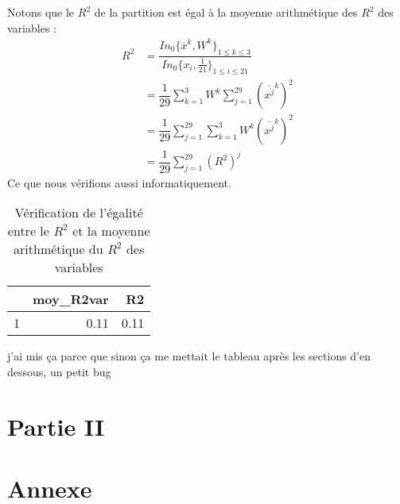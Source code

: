 \documentclass[a4paper,10pt]{article}
\newcommand{\dsum}[2]{\displaystyle\sum_{#1}^{#2}}
\begin{document}
Notons que le $R^2$ de la partition est égal à la moyenne arithmétique des $R^2$ des variables : 
$$\begin{array}{ll}
   R^2
   &=\dfrac{In_{0}\{\overline x^k,W^k\}_{1\leqslant k\leqslant 3}}{In_0\{x_i,\frac 1{21}\}_{1\leqslant i\leqslant 21}}\\
   &= \dfrac 1{29}\dsum{k=1}3W^k\dsum{j=1}{29}(\overline{x^j}^k)^2\\
   &=\dfrac 1{29}\dsum{j=1}{29}\dsum{k=1}3W^k(\overline{x^j}^k)^2\\
   &=\dfrac 1{29}\dsum{j=1}{29}(R^2)^j
  \end{array}$$
Ce que nous vérifions aussi informatiquement.
\begin{table}[ht]
	\centering
	\begin{tabular}{rrr}
		\hline
		& moy\_R2var & R2 \\ 
		\hline
		1 & 0.11 & 0.11 \\ 
		\hline
	\end{tabular}
	\caption{Vérification de l'égalité entre le $R^2$ et la moyenne arithmétique du $R^2$ des variables} 
\end{table}
\newpage
{\red j'ai mis ça parce que sinon ça me mettait le tableau après les sections d'en dessous, un petit bug}\\

\section{Partie II}
\section{Annexe}
\end{document}
